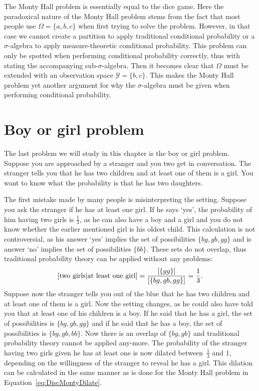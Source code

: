 \documentclass[a4paper]{report}
\theoremstyle{plain}
\theoremstyle{definition}
\theoremstyle{remark}
\numberwithin{equation}{chapter}
\let\P\relax
\DeclareMathOperator{\P}{\mathbb{P}}
\DeclareMathOperator{\1}{\mathbbm{1}}
\newcommand{\Y}{\mathcal{Y}}
\begin{document}
The Monty Hall problem is essentially equal to the dice game. Here the paradoxical nature of the Monty Hall problem stems from the fact that most people use $\Omega=\{a,b,c\}$ when first trying to solve the problem. However, in that case we cannot create a partition to apply traditional conditional probability or a $\sigma$-algebra to apply measure-theoretic conditional probability. This problem can only be spotted when performing conditional probability correctly, thus with stating the accompanying sub-$\sigma$-algebra. Then it becomes clear that $\Omega$ must be extended with an observation space $\Y=\{b,c\}$. This makes the Monty Hall problem yet another argument for why the $\sigma$-algebra must be given when performing conditional probability.

\section{Boy or girl problem}\label{sec:DiscChildren}
The last problem we will study in this chapter is the boy or girl problem. Suppose you are approached by a stranger and you two get in conversation. The stranger tells you that he has two children and at least one of them is a girl. You want to know what the probability is that he has two daughters.

The first mistake made by many people is misinterpreting the setting. Suppose you ask the stranger if he has at least one girl. If he says `yes', the probability of him having two girls is $\frac{1}{3}$, as he can also have a boy and a girl and you do not know whether the earlier mentioned girl is his oldest child. This calculation is not controversial, as his answer `yes' implies the set of possibilities $\{bg, gb, gg\}$ and is answer `no' implies the set of possibilities $\{bb\}$. These sets do not overlap, thus traditional probability theory can be applied without any problems:
\begin{equation}
\P[\text{two girls}|\text{at least one girl}]=\frac{\P[\{gg\}]}{\P[\{bg, gb, gg\}]}=\frac{1}{3}.
\end{equation}
Suppose now the stranger tells you out of the blue that he has two children and at least one of them is a girl. Now the setting changes, as he could also have told you that at least one of his children is a boy. If he said that he has a girl, the set of possibilities is $\{bg, gb, gg\}$ and if he said that he has a boy, the set of possibilities is $\{bg, gb, bb\}$. Now there is an overlap of $\{bg, gb\}$ and traditional probability theory cannot be applied any-more. The probability of the stranger having two girls given he has at least one is now dilated between~$\frac{1}{3}$ and $1$, depending on the willingness of the stranger to reveal he has a girl. This dilation can be calculated in the same manner as is done for the Monty Hall problem in Equation~\ref{eq:DiscMontyDilate}.
\end{document}

